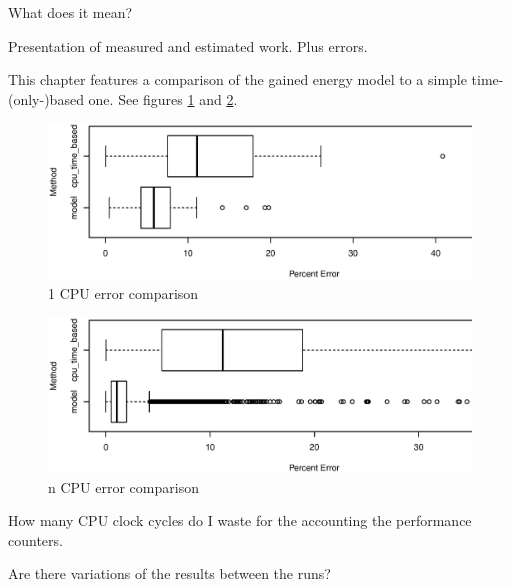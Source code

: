 \label{sec:evaluation}

What does it mean?


\label{sec:error}

Presentation of measured and estimated work. Plus errors.


\label{sec:time-based}

This chapter features a comparison of the gained energy model to a simple
time-(only-)based one. See figures \ref{fig:errs-1cpu} and \ref{fig:errs-ncpu}.

\begin{figure}
  \centering
    \includegraphics[width=\textwidth]{fig/1cpu-bench-errs.eps}
  \caption{1 CPU error comparison}
  \label{fig:errs-1cpu}
\end{figure}

\begin{figure}
  \centering
    \includegraphics[width=\textwidth]{fig/Ncpu-bench-errs.eps}
  \caption{n CPU error comparison}
  \label{fig:errs-ncpu}
\end{figure}



\label{sec:overhead}

How many CPU clock cycles do I waste for the accounting the performance
counters.


\label{sec:variation}

Are there variations of the results between the runs?
